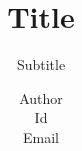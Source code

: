\documentclass[12pt]{beamer}
\title{\textbf{Title}}
\subtitle{
  Subtitle
}
\author[Luis Alejandro]{
  Author\\
  \footnotesize Id\\
  \footnotesize Email
}
\institute[UPTC]{
  University\\
  Department\\
  \begin{multicols}{2}
    \vspace*{-2mm}
    \begin{figure}[H]
      \centering
      \texttt{[image: color\_uptc.pdf]}
    \end{figure}
    \begin{figure}[H]
      \centering
      \texttt{[image: logo.png]}
    \end{figure}
  \end{multicols}
}
\date{}
\begin{document}
\frame{\titlepage}


\end{document}
